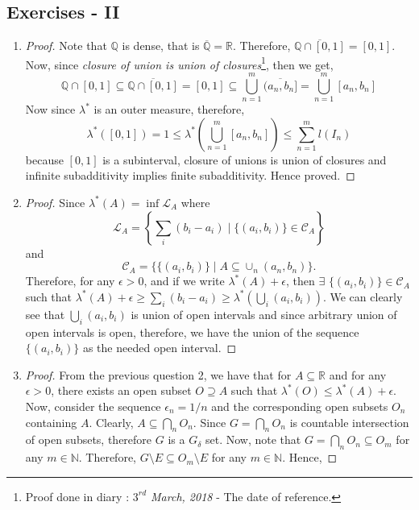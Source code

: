 \documentclass{article}
\theoremstyle{definition}
\theoremstyle{remark}
\theoremstyle{definition}
\theoremstyle{definition}
\theoremstyle{definition}
\newcommand{\union}{\cup}
\newcommand{\intrs}{\cap}
\newcommand{\bunion}{\bigcup}
\newcommand{\bintrs}{\bigcap}
\newcommand{\closure}[1]{\overline{#1}}
\newcommand{\where}{\;\vert\;}
\newcommand{\R}{\mathbb{R}}
\newcommand{\N}{\mathbb{N}}
\newcommand{\Q}{\mathbb{Q}}
\newcommand{\lom}[1]{\lambda^*\left (#1\right )}
\newcommand{\set}[1]{\mathscr{#1}}
\begin{document}
\subsection{Exercises - II}
\begin{enumerate}
	\item{\begin{proof}
			Note that $ \Q  $ is dense, that is $ \closure{\Q} = \R $. Therefore, $ \closure{\Q\intrs [0,1]} = [0,1] $. Now, since \emph{closure of union is union of closures}\footnote{Proof done in diary : \emph{$ 3^{rd} $ March, 2018} - The date of reference.}, then we get,
			\[\Q\intrs [0,1] \subseteq \closure{\Q\intrs [0,1]} = [0,1]\subseteq \bunion_{n=1}^m \closure{(a_n,b_n]} = \bunion_{n=1}^m [a_n,b_n]\]
			Now since $ \lambda^* $ is an outer measure, therefore,
			\[\lom{[0,1]} = 1 \le \lom{\bunion_{n=1}^m [a_n,b_n]} \le \sum_{n=1}^m l(I_n) \]
			because $ [0,1] $ is a subinterval, closure of unions is union of closures and infinite subadditivity implies finite subadditivity. Hence proved.
		\end{proof}
}
\item {\begin{proof}
		\label{E2-2}
		Since $ \lom{A} = \inf \set{L}_A$ where
		\[\set{L}_A = \left \{\sum_{i} (b_i - a_i)\where \{(a_i,b_i)\} \in \set{C}_A \right \}\]
		and 
		\[\set{C}_A = \{\{(a_i,b_i)\} \where A\subseteq \union_n (a_n,b_n) \}.\]
		Therefore, for any $ \epsilon >0 $, and if we write $ \lom{A} +\epsilon $, then $ \exists$ $ \{(a_i,b_i)\} \in \set{C}_A $ such that $ \lom{A} + \epsilon \ge \sum_i (b_i - a_i) \ge \lom{\bunion_i (a_i,b_i)} $. We can clearly see that $ \bunion_i (a_i,b_i) $ is union of open intervals and since arbitrary union of open intervals is open, therefore, we have the union of the sequence $ \{(a_i,b_i)\} $ as the needed open interval.
	\end{proof}
}
\item {\begin{proof}
		\label{E2-3}
		From the previous question 2, we have that for $ A \subseteq \R $ and for any $ \epsilon>0 $, there exists an open subset $ O\supseteq A $ such that $ \lom{O} \le \lom{A} + \epsilon $. Now, consider the sequence $ \epsilon_n = 1/n $ and the corresponding open subsets $ O_n $ containing $ A $. Clearly, $ A \subseteq \bintrs_n O_n $. Since $ G = \bintrs_n O_n$ is countable intersection of open subsets, therefore $ G $ is a $ G_\delta $ set. Now, note that $ G = \bintrs_n O_n \subseteq O_m $ for any $ m\in \N $. Therefore, $ G \setminus E \subseteq O_m\setminus E $ for any $ m\in \N $. Hence,

\end{proof}}
\end{enumerate}
\end{document}
